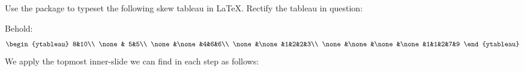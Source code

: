 \documentclass[12pt]{memoir}
\begin{document}
\begin{Ej}[Mandatory+2]
    Use the
     package to typeset the following skew tableau in \LaTeX. Rectify the tableau in question:
\end{Ej}

\begin{ptcbr}
    Behold:
    $$
    \begin{ytableau}
        8&10\\
        \none & 5&5\\
        \none&\none&4&6&6\\
        \none&\none&1&2&2&3\\
        \none&\none&\none&\none&1&1&2&7&9
        \end{ytableau}
    $$
We apply the topmost inner-slide we can find in each step as follows:
\begin{enumerate}
\end{enumerate}
\end{ptcbr}
\end{document}
